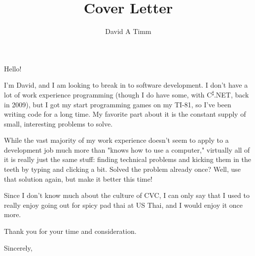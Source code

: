 \documentclass[letterpaper,12pt]{letter}
\author{David A Timm}
\title{Cover Letter}
\begin{document}
Hello!

I'm David, and I am looking to break in to software development. I don't have a
lot of work experience programming (though I do have some,  with
C\textsuperscript{{$\sharp$}}.NET, back in 2009), but I got my start programming
games on my TI-81, so I've been writing code for a long time. My favorite part
about it is the constant supply of small, interesting problems to solve.

While the vast majority of my work experience doesn't seem to apply to a
development job much more than "knows how to use a computer," virtually all of
it is really just the same stuff: finding technical problems and kicking them
in the teeth by typing and clicking a bit. Solved the problem already once?
Well, use that solution again, but make it better this time!

Since I don't know much about the culture of CVC, I can only say that I used to
really enjoy going out for spicy pad thai at US Thai, and I would enjoy it once
more.

Thank you for your time and consideration.

\vspace{2\parskip}
\closing{Sincerely,}
\end{document}
